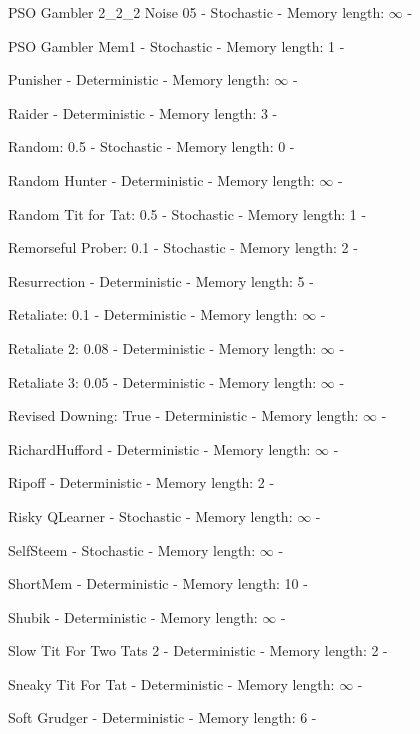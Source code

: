 \item PSO Gambler 2\_2\_2 Noise 05 - Stochastic - Memory length: \(\infty\) - \cite{Knight2018}
\item PSO Gambler Mem1 - Stochastic - Memory length: 1 - \cite{Knight2018}
\item Punisher - Deterministic - Memory length: \(\infty\) - \cite{Knight2018}
\item Raider - Deterministic - Memory length: 3 - \cite{Ashlock2014}
\item Random: 0.5 - Stochastic - Memory length: 0 - \cite{Axelrod1980, Tzafestas2000}
\item Random Hunter - Deterministic - Memory length: \(\infty\) - \cite{Knight2018}
\item Random Tit for Tat: 0.5 - Stochastic - Memory length: 1 - \cite{Knight2018}
\item Remorseful Prober: 0.1 - Stochastic - Memory length: 2 - \cite{Li2011}
\item Resurrection - Deterministic - Memory length: 5 - \cite{Eckhart2015}
\item Retaliate: 0.1 - Deterministic - Memory length: \(\infty\) - \cite{Knight2018}
\item Retaliate 2: 0.08 - Deterministic - Memory length: \(\infty\) - \cite{Knight2018}
\item Retaliate 3: 0.05 - Deterministic - Memory length: \(\infty\) - \cite{Knight2018}
\item Revised Downing: True - Deterministic - Memory length: \(\infty\) - \cite{Axelrod1980}
\item RichardHufford - Deterministic - Memory length: \(\infty\) - \cite{Axelrod1980b}
\item Ripoff - Deterministic - Memory length: 2 - \cite{Ashlock2008}
\item Risky QLearner - Stochastic - Memory length: \(\infty\) - \cite{Knight2018}
\item SelfSteem - Stochastic - Memory length: \(\infty\) - \cite{Andre2013}
\item ShortMem - Deterministic - Memory length: 10 - \cite{Andre2013}
\item Shubik - Deterministic - Memory length: \(\infty\) - \cite{Axelrod1980}
\item Slow Tit For Two Tats 2 - Deterministic - Memory length: 2 - \cite{Prison1998}
\item Sneaky Tit For Tat - Deterministic - Memory length: \(\infty\) - \cite{Knight2018}
\item Soft Grudger - Deterministic - Memory length: 6 - \cite{Li2011}
